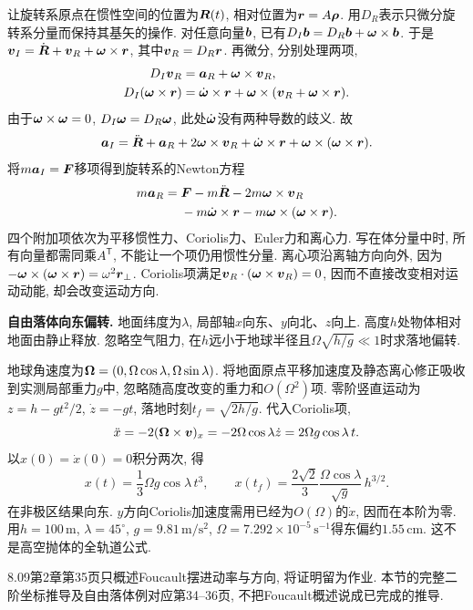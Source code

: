 让旋转系原点在惯性空间的位置为$\boldsymbol{R}(t)$, 相对位置为$\boldsymbol{r}=A\boldsymbol{\rho}$. 用$D_R$表示只微分旋转系分量而保持其基矢的操作. 对任意向量$\boldsymbol{b}$, 已有$D_I\boldsymbol{b}=D_R\boldsymbol{b}+\boldsymbol{\omega}\times\boldsymbol{b}$. 于是$\boldsymbol{v}_I=\dot{\boldsymbol{R}}+\boldsymbol{v}_R+\boldsymbol{\omega}\times\boldsymbol{r}$, 其中$\boldsymbol{v}_R=D_R\boldsymbol{r}$. 再微分, 分别处理两项,
\begin{align*}
D_I\boldsymbol{v}_R&=\boldsymbol{a}_R+\boldsymbol{\omega}\times\boldsymbol{v}_R,\\
D_I(\boldsymbol{\omega}\times\boldsymbol{r})
&=\dot{\boldsymbol{\omega}}\times\boldsymbol{r}+
\boldsymbol{\omega}\times(\boldsymbol{v}_R+\boldsymbol{\omega}\times\boldsymbol{r}).
\end{align*}
由于$\boldsymbol{\omega}\times\boldsymbol{\omega}=0$, $D_I\boldsymbol{\omega}=D_R\boldsymbol{\omega}$, 此处$\dot{\boldsymbol{\omega}}$没有两种导数的歧义. 故
\[
\boldsymbol{a}_I=\ddot{\boldsymbol{R}}+\boldsymbol{a}_R+2\boldsymbol{\omega}\times\boldsymbol{v}_R
+\dot{\boldsymbol{\omega}}\times\boldsymbol{r}+\boldsymbol{\omega}\times(\boldsymbol{\omega}\times\boldsymbol{r}).
\]
将$m\boldsymbol{a}_I=\boldsymbol{F}$移项得到旋转系的Newton方程
\begin{align*}
m\boldsymbol{a}_R={}&\boldsymbol{F}-m\ddot{\boldsymbol{R}}
-2m\boldsymbol{\omega}\times\boldsymbol{v}_R\\
&-m\dot{\boldsymbol{\omega}}\times\boldsymbol{r}
-m\boldsymbol{\omega}\times(\boldsymbol{\omega}\times\boldsymbol{r}).
\end{align*}
四个附加项依次为平移惯性力、Coriolis力、Euler力和离心力. 写在体分量中时, 所有向量都需同乘$A^{\mathsf T}$, 不能让一个项仍用惯性分量. 离心项沿离轴方向向外, 因为$-\boldsymbol{\omega}\times(\boldsymbol{\omega}\times\boldsymbol{r})=\omega^2\boldsymbol{r}_\perp$. Coriolis项满足$\boldsymbol{v}_R\cdot(\boldsymbol{\omega}\times\boldsymbol{v}_R)=0$, 因而不直接改变相对运动动能, 却会改变运动方向.

\begin{example}
\textbf{自由落体向东偏转.} 
地面纬度为$\lambda$, 局部轴$x$向东、$y$向北、$z$向上. 高度$h$处物体相对地面由静止释放. 忽略空气阻力, 在$h$远小于地球半径且$\Omega\sqrt{h/g}\ll1$时求落地偏转.
\end{example}
\begin{solution}
地球角速度为$\boldsymbol{\Omega}=(0,\Omega\cos\lambda,\Omega\sin\lambda)$. 将地面原点平移加速度及静态离心修正吸收到实测局部重力$g$中, 忽略随高度改变的重力和$O(\Omega^2)$项. 零阶竖直运动为$z=h-gt^2/2$, $\dot z=-gt$, 落地时刻$t_f=\sqrt{2h/g}$. 代入Coriolis项,
\[
\ddot x=-2(\boldsymbol{\Omega}\times\boldsymbol{v})_x
=-2\Omega\cos\lambda\dot z=2\Omega g\cos\lambda\,t.
\]
以$x(0)=\dot x(0)=0$积分两次, 得
\[
x(t)=\frac13\Omega g\cos\lambda\,t^3,\qquad
x(t_f)=\frac{2\sqrt2}{3}\frac{\Omega\cos\lambda}{\sqrt g}\,h^{3/2}.
\]
在非极区结果向东. $y$方向Coriolis加速度需用已经为$O(\Omega)$的$\dot x$, 因而在本阶为零. 用$h=100\,\mathrm m$, $\lambda=45^\circ$, $g=9.81\,\mathrm{m/s^2}$, $\Omega=7.292\times10^{-5}\,\mathrm{s^{-1}}$得东偏约$1.55\,\mathrm{cm}$. 这不是高空抛体的全轨道公式.
\end{solution}
8.09第2章第35页只概述Foucault摆进动率与方向, 将证明留为作业. 本节的完整二阶坐标推导及自由落体例对应第34--36页, 不把Foucault概述说成已完成的推导.

